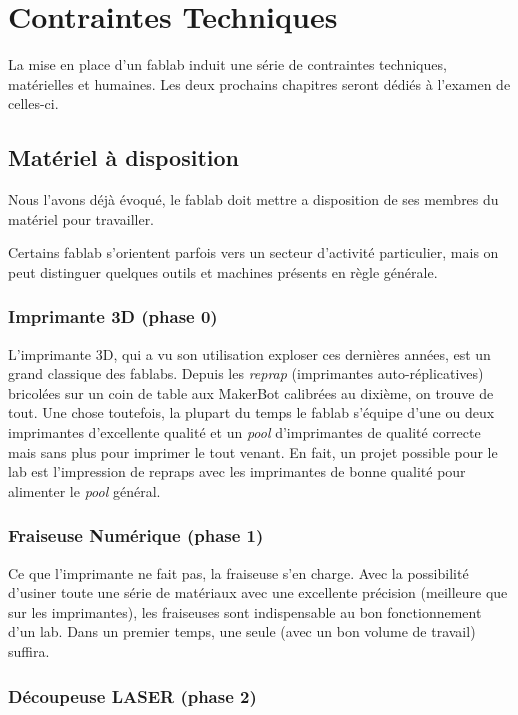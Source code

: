 \section{Contraintes Techniques}

La mise en place d'un fablab induit une série de contraintes techniques, matérielles et humaines. Les deux prochains
chapitres seront dédiés à l'examen de celles-ci.

\subsection{Matériel à disposition}

Nous l'avons déjà évoqué, le fablab doit mettre a disposition de ses membres du matériel pour travailler.

Certains fablab s'orientent parfois vers un secteur d'activité particulier, mais on peut distinguer quelques outils et machines
présents en règle générale.

\subsubsection{Imprimante 3D (phase 0)}

L'imprimante 3D, qui a vu son utilisation exploser ces dernières années, est un grand classique des fablabs. Depuis les
\textit{reprap} (imprimantes auto-réplicatives) bricolées sur un coin de table aux MakerBot calibrées au dixième, on trouve de
tout. Une chose toutefois, la plupart du temps le fablab s'équipe d'une ou deux imprimantes d'excellente qualité et un
\textit{pool} d'imprimantes de qualité correcte mais sans plus pour imprimer le tout venant. En fait, un projet possible pour
le lab est l'impression de repraps avec les imprimantes de bonne qualité pour alimenter le \textit{pool} général.

\subsubsection{Fraiseuse Numérique (phase 1)}

Ce que l'imprimante ne fait pas, la fraiseuse s'en charge. Avec la possibilité d'usiner toute une série de matériaux
avec une excellente précision (meilleure que sur les imprimantes), les fraiseuses sont indispensable au bon
fonctionnement d'un lab. Dans un premier temps, une seule (avec un bon volume de travail) suffira.

\subsubsection{Découpeuse LASER (phase 2)}


